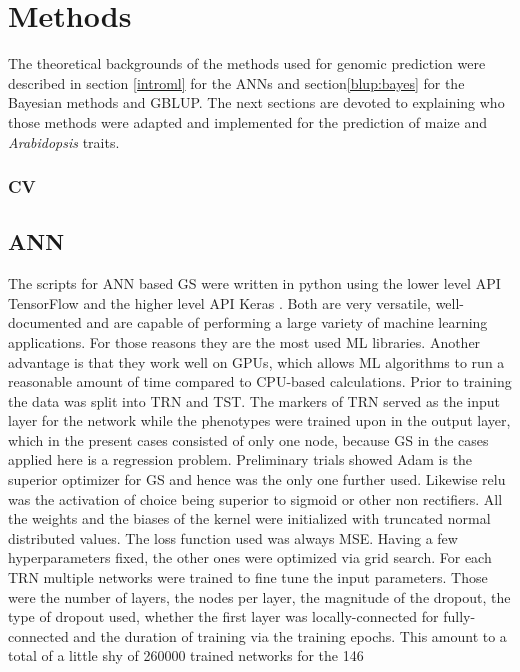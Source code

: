 \section{Methods}

The theoretical backgrounds of the methods used for genomic prediction were described in section \ref{introml}
for the ANNs and section\ref{blup:bayes} for the Bayesian methods and GBLUP. The next sections are devoted to
explaining who those methods were adapted and implemented for the prediction of maize and \textit{Arabidopsis}
traits.

\subsubsection{CV} \label{cv}

\subsection{ANN}
The scripts for ANN based GS were written in python using the lower level API TensorFlow \cite{TF2016} and the
higher level API Keras \cite{keras2015}. Both are very versatile, well-documented and are capable of
performing a large variety of machine learning applications. For those reasons they are the most used ML
libraries. Another advantage is that they work well on GPUs, which allows ML algorithms to run a reasonable
amount of time compared to CPU-based calculations. Prior to training the data was split into TRN and TST. The
markers of TRN served as the input layer for the network while the phenotypes were trained upon in the output
layer, which in the present cases consisted of only one node, because GS in the cases applied here is a
regression problem.  Preliminary trials showed Adam is the superior optimizer for GS and hence was the only
one further used. Likewise relu was the activation of choice being superior to sigmoid or other non
rectifiers. All the weights and the biases of the kernel were initialized with truncated normal distributed
values. The loss function used was always MSE. \newline Having a few hyperparameters fixed, the other ones
were optimized via grid search.  For each TRN multiple networks were trained to fine tune the input
parameters. Those were the number of layers, the nodes per layer, the magnitude of the dropout, the type of
dropout used, whether the first layer was locally-connected for fully-connected and the duration of training
via the training epochs. This amount to a total of a little shy of 260000 trained networks for the 146
